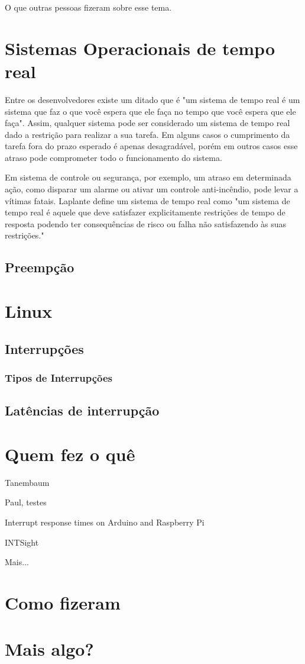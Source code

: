 
O que outras pessoas fizeram sobre esse tema.

\section{Sistemas Operacionais de tempo real}

Entre os desenvolvedores existe um ditado que é "um sistema de tempo real é um sistema que faz o que você espera que ele faça no tempo que você espera que ele faça". Assim, qualquer sistema pode ser considerado um sistema de tempo real dado a restrição para realizar a sua tarefa. Em alguns casos o cumprimento da tarefa fora do prazo esperado é apenas desagradável, porém em outros casos esse atraso pode comprometer todo o funcionamento do sistema. 

Em sistema de controle ou segurança, por exemplo, um atraso em determinada ação, como disparar um alarme ou ativar um controle anti-incêndio, pode levar a vítimas fatais. Laplante \cite{Laplante2004} define um sistema de tempo real como "um sistema de tempo real é aquele que deve satisfazer explicitamente restrições de tempo de resposta podendo ter consequências de risco ou falha não satisfazendo às suas restrições."

\subsection{Preempção}
\section{Linux}
\subsection{Interrupções}
\subsubsection{Tipos de Interrupções}
\subsection{Latências de interrupção}

\section{Quem fez o quê}

Tanembaum \cite{Tanenbaum2016}

Paul, testes \cite{Regnier2008}

Interrupt response times on Arduino and Raspberry Pi \cite{Solc2016}

INTSight \cite{Gerhorst2018}

Mais...

\section{Como fizeram}
\section{Mais algo?}